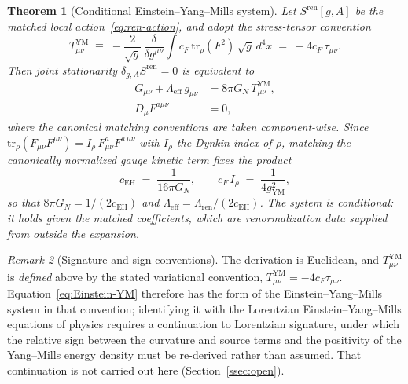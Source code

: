 \documentclass[12pt,a4paper]{article}
\newtheorem{theorem}{Theorem}[section]
\theoremstyle{remark}
\newtheorem{remark}[theorem]{Remark}
\begin{document}
      \begin{theorem}[Conditional Einstein--Yang--Mills system]
        \label{thm:EYM}
        Let $S^{\mathrm{ren}}[g,A]$ be the matched local action~\eqref{eq:ren-action}, and adopt
        the stress-tensor convention
        \[
          T^{\mathrm{YM}}_{\mu\nu}
          \;\equiv\; -\frac{2}{\sqrt{g}}\,
          \frac{\delta}{\delta g^{\mu\nu}}
          \int c_F\,\mathrm{tr}_\rho(F^2)\,\sqrt{g}\,d^4x
          \;=\; -4c_F\,\tau_{\mu\nu}.
        \]
        Then joint stationarity $\delta_{g,A}S^{\mathrm{ren}} = 0$ is equivalent to
        \begin{align}
          G_{\mu\nu} + \Lambda_{\mathrm{eff}}\,g_{\mu\nu}
          &= 8\pi G_N\,T^{\mathrm{YM}}_{\mu\nu},
          \label{eq:Einstein-YM}
          \\[4pt]
          D_\mu F^{a\mu\nu}
          &= 0,
          \label{eq:YM}
        \end{align}
        where the canonical matching conventions are taken component-wise. Since
        $\mathrm{tr}_\rho(F_{\mu\nu}F^{\mu\nu}) = I_\rho\,F^a_{\mu\nu}F^{a\,\mu\nu}$ with
        $I_\rho$ the Dynkin index of $\rho$, matching the canonically normalized gauge kinetic
        term fixes the \emph{product}
        \[
          c_{\mathrm{EH}} \;=\; \frac{1}{16\pi G_N},
          \qquad
          c_F\,I_\rho \;=\; \frac{1}{4g_{\mathrm{YM}}^2},
        \]
        so that $8\pi G_N = 1/(2c_{\mathrm{EH}})$ and
        $\Lambda_{\mathrm{eff}} = \Lambda_{\mathrm{ren}}/(2c_{\mathrm{EH}})$.
        The system is \emph{conditional}: it holds given the matched coefficients, which are
        renormalization data supplied from outside the expansion.
      \end{theorem}

      \begin{remark}[Signature and sign conventions]
        \label{rem:signature}
        The derivation is Euclidean, and $T^{\mathrm{YM}}_{\mu\nu}$ is \emph{defined} above by
        the stated variational convention, $T^{\mathrm{YM}}_{\mu\nu} = -4c_F\tau_{\mu\nu}$.
        Equation~\eqref{eq:Einstein-YM} therefore has the form of the Einstein--Yang--Mills
        system in that convention; identifying it with the Lorentzian Einstein--Yang--Mills
        equations of physics requires a continuation to Lorentzian signature, under which the
        relative sign between the curvature and source terms and the positivity of the
        Yang--Mills energy density must be re-derived rather than assumed.
        That continuation is not carried out here (Section~\ref{ssec:open}).
      \end{remark}
\end{document}
